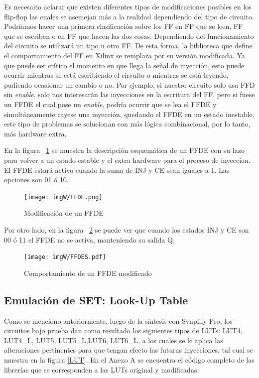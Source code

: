 \documentclass[a4paper,openright,12pt]{report}
\begin{document}
Es necesario  aclarar que existen diferentes tipos de modificaciones posibles en los flip-flop las cuales se asemejan más a la realidad dependiendo del tipo de circuito. Podríamos hacer una primera clasificación sobre los FF en FF que se leen, FF que  se escriben o en FF que hacen las dos cosas. Dependiendo del funcionamiento del circuito se utilizará un tipo u otro FF. De esta forma, la biblioteca que define el comportamiento del FF en Xilinx se remplaza por su versión modificada. Ya que puede ser crítico el momento en que llega la señal de inyección, esto puede ocurrir mientras se está escribiendo el circuito o mientras se está leyendo, pudiendo ocasionar un cambio o no. Por ejemplo, si nuestro circuito solo usa FFD sin \textit{enable}, solo nos interesarán las inyecciones en la escritura del FF, pero si fuese un FFDE el cual pose un \textit{enable}, podría ocurrir que se lea  el FFDE y simultáneamente cayese una inyección, quedando el FFDE en un estado inestable, este tipo de problemas se solucionan con  más lógica combinacional, por lo tanto, más hardware extra.

En la figura ~\ref{FFDE} se muestra la descripción esquemática de un FFDE con su lazo para volver  a un estado estable y el extra hardware para el proceso de inyeccion. El FFDE estará activo cuando la suma de INJ y CE sean iguales a 1. Las opciones son  01 ó 10.  


\begin{figure}[H]
	\centering
	\texttt{[image: imgW/FFDE.png]}
	\caption{Modificación de un FFDE }
	\label{FFDE}
\end{figure}

Por otro lado, en la figura ~\ref{FFDESS}  se puede ver que cuando los estados INJ  y CE son 00 ó 11 el FFDE  no se activa, manteniendo su salida Q.

\begin{figure}[H]
	\centering
	\texttt{[image: imgW/FFDES.pdf]}
	\caption{Comportamiento de un FFDE  modificado }
	\label{FFDESS}
\end{figure}


\subsection{Emulación de SET: Look-Up Table }

Como se menciono anteriormente, luego  de la síntesis con  Synplify Pro, los circuitos  bajo prueba dan como resultado los siguientes tipos de LUTs: LUT4, LUT4\_L, LUT5, LUT5\_L,LUT6, LUT6\_L, a los cuales se le aplica las alteraciones pertinentes para que tengan efecto las futuras inyecciones, tal cual se muestra en la figura \ref{LUT}. En el Anexo A se encuentra el código completo de las librerías que se corresponden a las LUTs original y modificadas.
\end{document}
